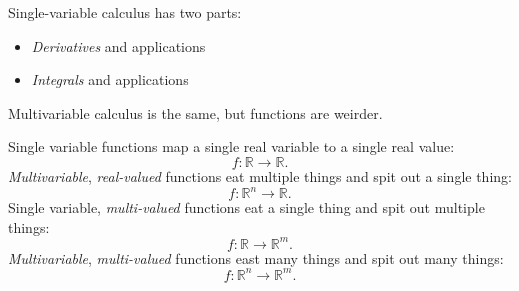 \documentclass[11pt]{article}
\begin{document}
Single-variable calculus has two parts:
\begin{itemize}
\item \emph{Derivatives} and applications
\item \emph{Integrals} and applications
\end{itemize}
Multivariable calculus is the same, but functions are weirder.

Single variable functions map a single real variable to a single real value:
\[
    f\colon \mathbb R \to \mathbb R.
\]
\emph{Multivariable}, \emph{real-valued} functions eat multiple things and spit out a single thing:
\[
    f\colon \mathbb R^n \to \mathbb R.
\]
Single variable, \emph{multi-valued} functions eat a single thing and spit out multiple things:
\[
    f\colon \mathbb R \to \mathbb R^m.
\]
\emph{Multivariable}, \emph{multi-valued} functions east many things and spit out many things:
\[
    f\colon \mathbb R^n \to \mathbb R^m.
\]
\end{document}
